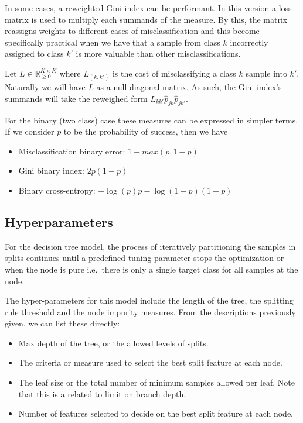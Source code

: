 In some cases, a reweighted Gini index can be performant.
In this version a loss matrix is used to multiply each summands of the measure.
By this, the matrix reassigns weights to different cases of misclassification and this become specifically practical when we have that a sample from class $k$ incorrectly assigned to class $k'$ is more valuable than other misclassifications.

Let $L \in \mathbb R_{\ge 0}^{K \times K}$ where $L_{(k,k')}$ is the cost of misclassifying a class $k$ sample into $k'$.
Naturally we will have $L$ as a null diagonal matrix.
As such, the Gini index's summands will take the reweighed form $L_{kk'} \hat{p}_{jk} \hat{p}_{jk'}$.

For the binary (two class) case these measures can be expressed in simpler terms.
If we consider $p$ to be the probability of success, then we have

\begin{itemize}
\item Misclassification binary error: $1 - max(p, 1-p)$ \label{it:decisionTreeCostFunctions}
\item Gini binary index: $ 2p(1-p) $
\item Binary cross-entropy: $ -\log(p)p - \log(1- p)(1-p) $
\end{itemize}



\subsection{Hyperparameters}\label{subsection:decision_trees_hyperparameters}

For the decision tree model, the process of iteratively partitioning the samples in splits continues until a predefined tuning parameter stops the optimization or when the node is pure i.e.\ there is only a single target class for all samples at the node.

The hyper-parameters for this model include the length of the tree, the splitting rule threshold and the node impurity measures.
From the descriptions previously given, we can list these directly:

\begin{itemize}
\item Max depth of the tree, or the allowed levels of splits.
\item The criteria or measure used to select the best split feature at each node.
\item The leaf size or the total number of minimum samples allowed per leaf.
Note that this is a related to limit on branch depth.
\item Number of features selected to decide on the best split feature at each node.
\end{itemize}


